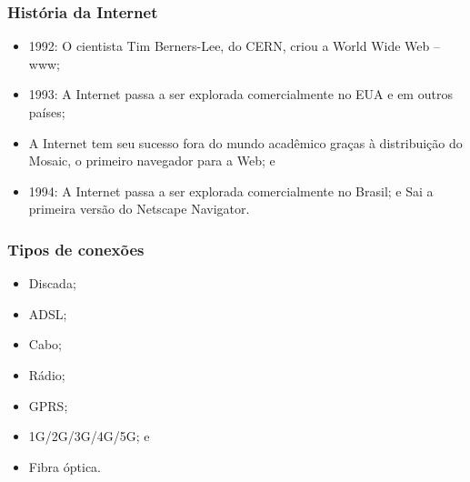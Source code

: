 \documentclass[aspectratio=169]{beamer} %
\begin{document}
\begin{frame}
	\frametitle{História da Internet}
			
	\begin{itemize}
		\item 1992: O cientista Tim Berners-Lee, do CERN, criou a World Wide Web – www;
		\item 1993: A Internet passa a ser explorada comercialmente no EUA e em outros países;
		\item A Internet tem seu sucesso fora do mundo acadêmico graças à distribuição do Mosaic, o primeiro navegador para a Web; e
		\item 1994: A Internet passa a ser explorada comercialmente no Brasil; e Sai a primeira versão do Netscape Navigator.
	\end{itemize}
\end{frame}

\begin{frame}
	\frametitle{Tipos de conexões}
			
	\begin{itemize}
		\item Discada; 
		\item ADSL;
		\item Cabo;
		\item Rádio;
		\item GPRS;
		\item 1G/2G/3G/4G/5G; e
		\item Fibra óptica.
	\end{itemize}
\end{frame}
\end{document}
